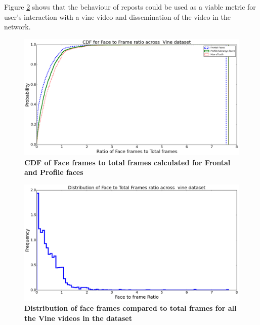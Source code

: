 Figure \ref{fig:Like_Repost_CDF} shows that the behaviour of reposts could be used as a viable metric for user's interaction with a vine video and dissemination of the video in the network. 

\begin{figure}
\centering
\includegraphics[width=\columnwidth]{plots/CDF_Compound}
\caption{\textbf{CDF of Face frames to total frames calculated for Frontal and Profile faces }}
\label{fig:Like_Repost_CDF}
\end{figure}

\begin{figure}
\centering
\includegraphics[width=\columnwidth]{plots/faceratio_destribution_dataset}
\caption{\textbf{ Distribution of face frames compared to total frames for all the Vine videos in the dataset}}
\label{fig:Like_Repost_CDF}
\end{figure}
